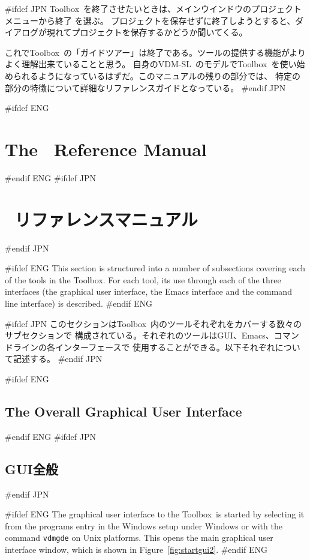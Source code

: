 \documentclass[\pformat,12pt]{article}
\newcommand{\vdmslpp}{VDM-SL}
\newcommand{\Toolbox}{Toolbox}
\newcommand{\vdmgde}{vdmgde}
\newcommand{\vdmslpp}{VDM++}
\newcommand{\Toolbox}{Toolbox}
\newcommand{\vdmgde}{vppgde}
\newcommand{\guicmd}[1]{{\sf #1}}
\newcommand{\guicmd}[1]{{\gt #1}}
\begin{document}
#ifdef JPN
\Toolbox\ を終了させたいときは、メインウインドウの\guicmd{プロジェクト} メニューから\guicmd{終了} を選ぶ。
プロジェクトを保存せずに終了しようとすると、ダイアログが現れてプロジェクトを保存するかどうか聞いてくる。

これで\Toolbox\ の「ガイドツアー」は終了である。ツールの提供する機能がよりよく理解出来ていることと思う。
自身の\vdmslpp\ のモデルで\Toolbox\ を使い始められるようになっているはずだ。このマニュアルの残りの部分では、
特定の部分の特徴について詳細なリファレンスガイドとなっている。
#endif JPN

\newpage
#ifdef ENG
\section{The \protect\VDMTools\ Reference Manual}\label{sec:ref}
#endif ENG
#ifdef JPN
\section{\protect\VDMTools\ リファレンスマニュアル}\label{sec:ref}
#endif JPN

#ifdef ENG
This section is structured into a number of subsections covering each
of the tools in the \Toolbox. For each tool, its use through each of
the three interfaces (the graphical user interface, the Emacs
interface and the command line interface) is described.
#endif ENG

#ifdef JPN
このセクションは\Toolbox\ 内のツールそれぞれをカバーする数々のサブセクションで
構成されている。それぞれのツールはGUI、Emacs、コマンドラインの各インターフェースで
使用することができる。以下それぞれについて記述する。
#endif JPN

#ifdef ENG
\subsection{The Overall Graphical User Interface}\label{sec:GUI}
#endif ENG
#ifdef JPN
\subsection{GUI全般}\label{sec:GUI}
#endif JPN

#ifdef ENG
The graphical user interface to the \Toolbox\ is started by selecting
it from the programs entry in the Windows setup under Windows or with
the command {\tt \vdmgde} on Unix platforms.
This opens the main graphical user interface window, which is shown in 
Figure~\ref{fig:startgui2}. 
#endif ENG
\end{document}

